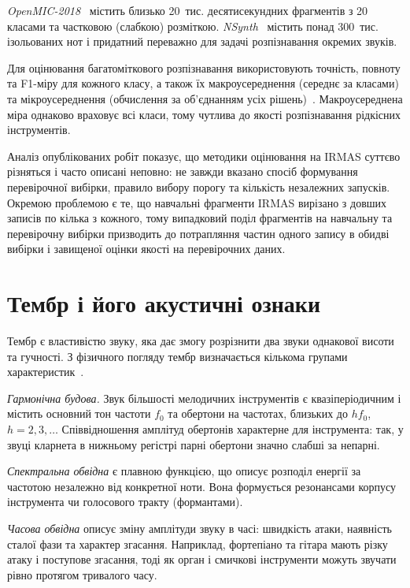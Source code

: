 \textit{OpenMIC-2018}~\cite{openmic2018} містить близько 20~тис.
десятисекундних фрагментів з 20 класами та частковою (слабкою)
розміткою. \textit{NSynth}~\cite{engel2017} містить понад 300~тис.
ізольованих нот і придатний переважно для задачі розпізнавання окремих
звуків.

Для оцінювання багатоміткового розпізнавання використовують точність,
повноту та F1-міру для кожного класу, а також їх макроусереднення (середнє
за класами) та мікроусереднення (обчислення за об'єднанням усіх
рішень)~\cite{sokolova2009}. Макроусереднена міра однаково враховує всі
класи, тому чутлива до якості розпізнавання рідкісних інструментів.

Аналіз опублікованих робіт показує, що методики оцінювання на IRMAS
суттєво різняться і часто описані неповно: не завжди вказано спосіб
формування перевірочної вибірки, правило вибору порогу та кількість
незалежних запусків. Окремою проблемою є те, що навчальні фрагменти IRMAS
вирізано з довших записів по кілька з кожного, тому випадковий поділ
фрагментів на навчальну та перевірочну вибірки призводить до потрапляння
частин одного запису в обидві вибірки і завищеної оцінки якості на
перевірочних даних.

\section{Тембр і його акустичні ознаки}
\label{sec:timbre}

Тембр є властивістю звуку, яка дає змогу розрізнити два звуки
однакової висоти та гучності. З фізичного погляду тембр визначається
кількома групами характеристик~\cite{muller2015,herrera2003}.

\textit{Гармонічна будова.} Звук більшості мелодичних інструментів є
квазіперіодичним і містить основний тон частоти $f_0$ та обертони на
частотах, близьких до $h f_0$, $h = 2, 3, \ldots$ Співвідношення амплітуд
обертонів характерне для інструмента: так, у звуці кларнета в нижньому
регістрі парні обертони значно слабші за непарні.

\textit{Спектральна обвідна} є плавною функцією, що описує розподіл
енергії за частотою незалежно від конкретної ноти. Вона формується
резонансами корпусу інструмента чи голосового тракту (формантами).

\textit{Часова обвідна} описує зміну амплітуди звуку в часі: швидкість
атаки, наявність сталої фази та характер згасання. Наприклад, фортепіано та
гітара мають різку атаку і поступове згасання, тоді як орган і смичкові
інструменти можуть звучати рівно протягом тривалого часу.

